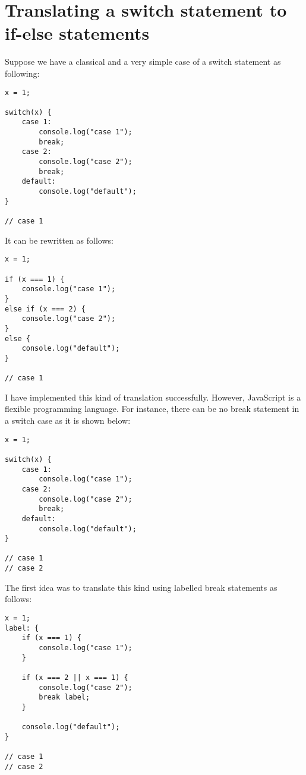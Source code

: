 \documentclass[a4paper]{article}
\begin{document}


\section*{Translating a switch statement to if-else statements}

Suppose we have a classical and a very simple case of a switch statement as following:


\begin{lstlisting}
x = 1;

switch(x) {
    case 1: 
        console.log("case 1");
        break;
    case 2:
        console.log("case 2");	
        break;
    default:
        console.log("default");
}

// case 1
\end{lstlisting}

It can be rewritten as follows:

\begin{lstlisting}
x = 1;

if (x === 1) { 
    console.log("case 1");
}
else if (x === 2) {
    console.log("case 2");	
}
else {
    console.log("default");
}

// case 1
\end{lstlisting}

I have implemented this kind of translation successfully. However, JavaScript is a flexible programming language. For instance, there can be no break statement in a switch case as it is shown below:

\begin{lstlisting}
x = 1;

switch(x) {
    case 1: 
        console.log("case 1");
    case 2:
        console.log("case 2");	
        break;
    default:
        console.log("default");
}

// case 1
// case 2
\end{lstlisting}

The first idea was to translate this kind  using labelled break statements as follows:

\begin{lstlisting}
x = 1;
label: {
    if (x === 1) { 
        console.log("case 1");
    }
	
    if (x === 2 || x === 1) {
        console.log("case 2");	
        break label;
    }
	
    console.log("default");
}

// case 1
// case 2
\end{lstlisting}
\end{document}
